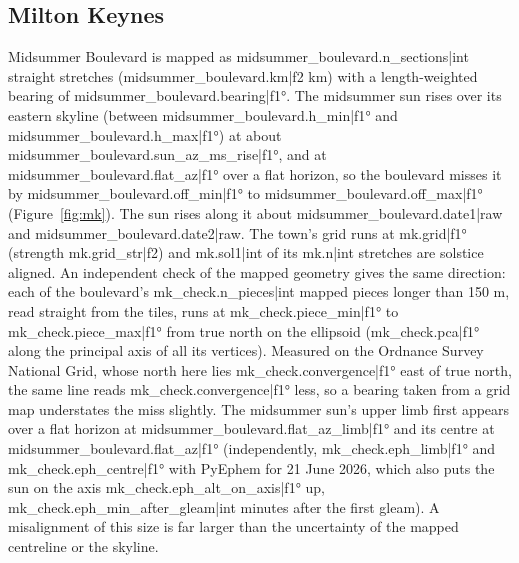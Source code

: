 \documentclass[11pt,a4paper]{article}
\begin{document}
\subsection{Milton Keynes}
Midsummer Boulevard is mapped as {{midsummer_boulevard.n_sections|int}} straight stretches ({{midsummer_boulevard.km|f2}} km) with a length-weighted bearing of {{midsummer_boulevard.bearing|f1}}°. The midsummer sun rises over its eastern skyline (between {{midsummer_boulevard.h_min|f1}}° and {{midsummer_boulevard.h_max|f1}}°) at about {{midsummer_boulevard.sun_az_ms_rise|f1}}°, and at {{midsummer_boulevard.flat_az|f1}}° over a flat horizon, so the boulevard misses it by {{midsummer_boulevard.off_min|f1}}° to {{midsummer_boulevard.off_max|f1}}° (Figure~\ref{fig:mk}). The sun rises along it about {{midsummer_boulevard.date1|raw}} and {{midsummer_boulevard.date2|raw}}. The town's grid runs at {{mk.grid|f1}}° (strength {{mk.grid_str|f2}}) and {{mk.sol1|int}} of its {{mk.n|int}} stretches are solstice aligned. An independent check of the mapped geometry gives the same direction: each of the boulevard's {{mk_check.n_pieces|int}} mapped pieces longer than 150 m, read straight from the tiles, runs at {{mk_check.piece_min|f1}}° to {{mk_check.piece_max|f1}}° from true north on the ellipsoid ({{mk_check.pca|f1}}° along the principal axis of all its vertices). Measured on the Ordnance Survey National Grid, whose north here lies {{mk_check.convergence|f1}}° east of true north, the same line reads {{mk_check.convergence|f1}}° less, so a bearing taken from a grid map understates the miss slightly. The midsummer sun's upper limb first appears over a flat horizon at {{midsummer_boulevard.flat_az_limb|f1}}° and its centre at {{midsummer_boulevard.flat_az|f1}}° (independently, {{mk_check.eph_limb|f1}}° and {{mk_check.eph_centre|f1}}° with PyEphem for 21 June 2026, which also puts the sun on the axis {{mk_check.eph_alt_on_axis|f1}}° up, {{mk_check.eph_min_after_gleam|int}} minutes after the first gleam). A misalignment of this size is far larger than the uncertainty of the mapped centreline or the skyline.
\end{document}
